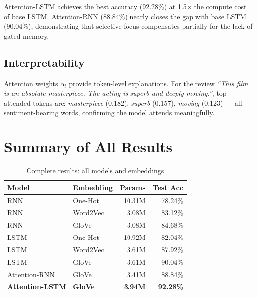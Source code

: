 \documentclass[10pt,a4paper,twocolumn]{article}
\begin{document}
Attention-LSTM achieves the best accuracy (92.28\%) at 1.5$\times$
the compute cost of base LSTM. Attention-RNN (88.84\%) nearly closes the
gap with base LSTM (90.04\%), demonstrating that selective focus compensates
partially for the lack of gated memory.

\subsection{Interpretability}

Attention weights $\alpha_t$ provide token-level explanations. For the
review \textit{``This film is an absolute masterpiece. The acting is superb
and deeply moving.''}, top attended tokens are: \textit{masterpiece}
(0.182), \textit{superb} (0.157), \textit{moving} (0.123) — all
sentiment-bearing words, confirming the model attends meaningfully.

\section*{Summary of All Results}

\begin{table}[H]
\centering\small
\caption{Complete results: all models and embeddings}
\begin{tabular}{llrr}
\toprule
Model & Embedding & Params & Test Acc\\
\midrule
RNN          & One-Hot  & 10.31M & 78.24\%\\
RNN          & Word2Vec &  3.08M & 83.12\%\\
RNN          & GloVe    &  3.08M & 84.68\%\\
LSTM         & One-Hot  & 10.92M & 82.04\%\\
LSTM         & Word2Vec &  3.61M & 87.92\%\\
LSTM         & GloVe    &  3.61M & 90.04\%\\
Attention-RNN  & GloVe  &  3.41M & 88.84\%\\
\rowcolor{lightblue}
\textbf{Attention-LSTM} & \textbf{GloVe} & \textbf{3.94M} & \textbf{92.28\%}\\
\bottomrule
\end{tabular}
\label{tab:final}
\end{table}
\end{document}
